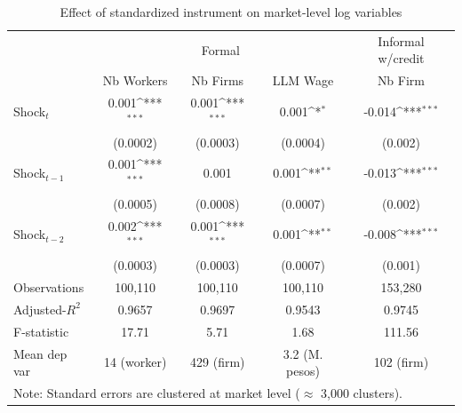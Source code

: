 \begin{table}[H]
\centering
\caption{Effect of standardized instrument on market-level log variables}
\label{shocks_activity}
\def\sym#1{\ifmmode^{#1}\else\(^{#1}\)\fi}
\begin{tabular}{l*{4}{c}}
\hline\hline
\hline
              & \multicolumn{3}{|c|}{Formal}  & Informal w/credit \\
              & \multicolumn{1}{|c}{Nb Workers} & Nb Firms & \multicolumn{1}{c|}{LLM Wage} & Nb Firm \\
\hline
Shock$_{t}$   & 0.001\sym{***} & 0.001\sym{***} & 0.001\sym{*}   & -0.014\sym{***}  \\
              & (0.0002)       & (0.0003)       & (0.0004)       & (0.002)          \\
[1em]
Shock$_{t-1}$ & 0.001\sym{***} & 0.001          & 0.001\sym{**}  & -0.013\sym{***}  \\
              & (0.0005)       & (0.0008)       & (0.0007)       & (0.002)          \\
Shock$_{t-2}$ & 0.002\sym{***} & 0.001\sym{***} & 0.001\sym{**}  & -0.008\sym{***}  \\
              & (0.0003)       & (0.0003)       & (0.0007)       & (0.001)          \\
\hline
Observations       & 100,110   & 100,110        & 100,110        & 153,280          \\
Adjusted-\(R^{2}\) & 0.9657    & 0.9697         & 0.9543         & 0.9745           \\
F-statistic        & 17.71     & 5.71           & 1.68           & 111.56           \\
Mean dep var       &14 (worker)& 429 (firm)     & 3.2 (M. pesos) & 102 (firm)       \\
\hline\hline
\multicolumn{5}{l}{\footnotesize Note: Standard errors are clustered at market level ($\approx$ 3,000 clusters).}\\
\end{tabular}
\end{table}